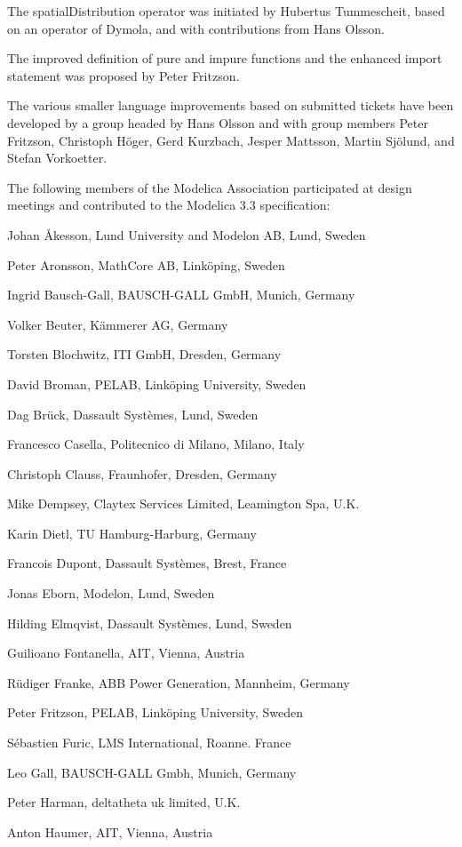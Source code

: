 \documentclass[10pt,a4paper]{report}
\begin{document}
The spatialDistribution operator was initiated by Hubertus Tummescheit,
based on an operator of Dymola, and with contributions from Hans Olsson.

The improved definition of pure and impure functions and the enhanced
import statement was proposed by Peter Fritzson.

The various smaller language improvements based on submitted tickets
have been developed by a group headed by Hans Olsson and with group
members Peter Fritzson, Christoph Höger, Gerd Kurzbach, Jesper Mattsson,
Martin Sjölund, and Stefan Vorkoetter.

The following members of the Modelica Association participated at design
meetings and contributed to the Modelica 3.3 specification:

Johan Åkesson, Lund University and Modelon AB, Lund, Sweden

Peter Aronsson, MathCore AB, Linköping, Sweden

Ingrid Bausch-Gall, BAUSCH-GALL GmbH, Munich, Germany

Volker Beuter, Kämmerer AG, Germany

Torsten Blochwitz, ITI GmbH, Dresden, Germany

David Broman, PELAB, Linköping University, Sweden

Dag Brück, Dassault Systèmes, Lund, Sweden

Francesco Casella, Politecnico di Milano, Milano, Italy

Christoph Clauss, Fraunhofer, Dresden, Germany

Mike Dempsey, Claytex Services Limited, Leamington Spa, U.K.

Karin Dietl, TU Hamburg-Harburg, Germany

Francois Dupont, Dassault Systèmes, Brest, France

Jonas Eborn, Modelon, Lund, Sweden

Hilding Elmqvist, Dassault Systèmes, Lund, Sweden

Guilioano Fontanella, AIT, Vienna, Austria

Rüdiger Franke, ABB Power Generation, Mannheim, Germany

Peter Fritzson, PELAB, Linköping University, Sweden

Sébastien Furic, LMS International, Roanne. France

Leo Gall, BAUSCH-GALL Gmbh, Munich, Germany

Peter Harman, deltatheta uk limited, U.K.

Anton Haumer, AIT, Vienna, Austria
\end{document}
